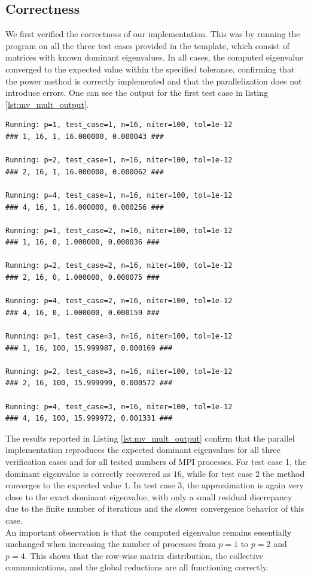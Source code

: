 \documentclass[unicode,10pt,a4paper,oneside,numbers=endperiod,openany]{scrartcl}
\begin{document}
\subsection{Correctness}
We first verified the correctness of our implementation. This was by running the program on all the three test cases provided in the template, which consist of matrices with known dominant eigenvalues. In all cases, the computed eigenvalue converged to the expected value within the specified tolerance, confirming that the power method is correctly implemented and that the parallelization does not introduce errors. One can see the output for the first test case in listing \ref{lst:mv_mult_output}.
\begin{lstlisting}[style=grayverbatim, caption={Output of the power method for the first test case}, label={lst:mv_mult_output}]
    Running: p=1, test_case=1, n=16, niter=100, tol=1e-12
### 1, 16, 1, 16.000000, 0.000043 ###

Running: p=2, test_case=1, n=16, niter=100, tol=1e-12
### 2, 16, 1, 16.000000, 0.000062 ###

Running: p=4, test_case=1, n=16, niter=100, tol=1e-12
### 4, 16, 1, 16.000000, 0.000256 ###

Running: p=1, test_case=2, n=16, niter=100, tol=1e-12
### 1, 16, 0, 1.000000, 0.000036 ###

Running: p=2, test_case=2, n=16, niter=100, tol=1e-12
### 2, 16, 0, 1.000000, 0.000075 ###

Running: p=4, test_case=2, n=16, niter=100, tol=1e-12
### 4, 16, 0, 1.000000, 0.000159 ###

Running: p=1, test_case=3, n=16, niter=100, tol=1e-12
### 1, 16, 100, 15.999987, 0.000169 ###

Running: p=2, test_case=3, n=16, niter=100, tol=1e-12
### 2, 16, 100, 15.999999, 0.000572 ###

Running: p=4, test_case=3, n=16, niter=100, tol=1e-12
### 4, 16, 100, 15.999972, 0.001331 ###
\end{lstlisting}
The results reported in Listing \ref{lst:mv_mult_output} confirm that the parallel implementation reproduces the expected dominant eigenvalues for all three verification cases and for all tested numbers of MPI processes. For test case 1, the dominant eigenvalue is correctly recovered as $16$, while for test case 2 the method converges to the expected value $1$. In test case 3, the approximation is again very close to the exact dominant eigenvalue, with only a small residual discrepancy due to the finite number of iterations and the slower convergence behavior of this case.\\
An important observation is that the computed eigenvalue remains essentially unchanged when increasing the number of processes from $p=1$ to $p=2$ and $p=4$. This shows that the row-wise matrix distribution, the collective communications, and the global reductions are all functioning correctly.
\end{document}
